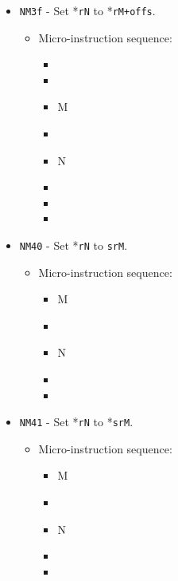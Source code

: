 \documentclass{article}
\begin{document}
\begin{itemize}
    \item \Verb|NM3f| - Set *\Verb|rN| to *\Verb|rM+offs|.
    \begin{itemize}
        \item Micro-instruction sequence:
        \begin{itemize}
            \item \pkptroutinc
            \item \datatooffs
            \item \regptodatao M
            \item \holddata
            \item \regtoaddr N
            \item \writeRAM
            \item \incrementpk
            \item \done
        \end{itemize}
    \end{itemize}
    
    \item \Verb|NM40| - Set *\Verb|rN| to \Verb|srM|.
    \begin{itemize}
        \item Micro-instruction sequence:
        \begin{itemize}
            \item \specialtodata M
            \item \holddata
            \item \regtoaddr N
            \item \writeRAM
            \item \done
        \end{itemize}
    \end{itemize}

    \item \Verb|NM41| - Set *\Verb|rN| to *\Verb|srM|.
    \begin{itemize}
        \item Micro-instruction sequence:
        \begin{itemize}
            \item \specialptodata M
            \item \holddata
            \item \regtoaddr N
            \item \writeRAM
            \item \done
        \end{itemize}
    \end{itemize}


\end{itemize}
\end{document}
